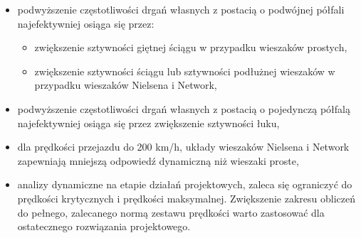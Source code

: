 \begin{itemize}
	\item podwyższenie częstotliwości drgań własnych z postacią o podwójnej półfali najefektywniej osiąga się przez: 
	\begin{itemize}
	\item zwiększenie sztywności giętnej ściągu w przypadku wieszaków prostych, 
	\item zwiększenie sztywności ściągu lub sztywności podłużnej wieszaków w przypadku wieszaków Nielsena i Network,
	\end{itemize}
	\item podwyższenie częstotliwości drgań własnych z postacią o pojedynczą półfalą najefektywniej osiąga się przez zwiększenie sztywności łuku,
	\item dla prędkości przejazdu do 200 km/h, układy wieszaków Nielsena i Network zapewniają mniejszą odpowiedź dynamiczną niż wieszaki proste,
	\item analizy dynamiczne na etapie działań projektowych, zaleca się ograniczyć do prędkości krytycznych i prędkości maksymalnej. Zwiększenie zakresu obliczeń do pełnego, zalecanego normą zestawu prędkości warto zastosować dla ostatecznego rozwiązania projektowego.
\end{itemize}


